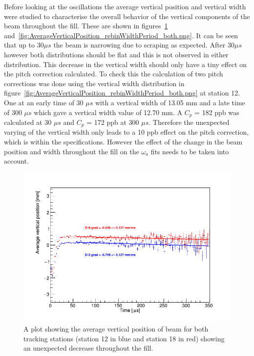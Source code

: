 Before looking at the oscillations the average vertical position and vertical width were studied to characterise the overall behavior of the vertical components of the beam throughout the fill. These are shown in figures~\ref{fig:AverageVerticalPosition_rebinMeanPeriod_both.png} and~\ref{fig:AverageVerticalPosition_rebinWidthPeriod_both.png}. It can be seen that up to 30$\mu{s}$ the beam is narrowing due to scraping as expected. After 30$\mu{s}$ however both distributions should be flat and this is not observed in either distribution. This decrease in the vertical width should only have a tiny effect on the pitch correction calculated. To check this the calculation of two pitch corrections was done using the vertical width distribution in figure~\ref{fig:AverageVerticalPosition_rebinWidthPeriod_both.png} at station 12. One at an early time of 30 $\mu{s}$ with a vertical width of 13.05 mm and a late time of 300 $\mu{s}$ which gave a vertical width value of 12.70 mm. A $C_p$ = 182 ppb was calculated at 30 $\mu{s}$ and  $C_p$ = 172 ppb at 300 $\mu{s}$. Therefore the unexpected varying of the vertical width only leads to a 10 ppb effect on the pitch correction, which is within the specifications. However the effect of the change in the beam position and width throughout the fill on the $\omega_{a}$ fits needs to be taken into account.

\begin{figure}[ht]
\centering 
\includegraphics[scale=0.5]{Figures/AverageVerticalPosition_rebinMeanPeriod_both.png}
\decoRule
\caption{A plot showing the average vertical position of beam for both tracking stations (station 12 in blue and station 18 in red) showing an unexpected decrease throughout the fill.}
\label{fig:AverageVerticalPosition_rebinMeanPeriod_both.png}
\end{figure}

